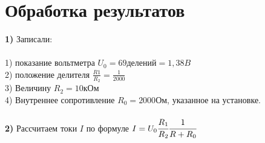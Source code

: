 \documentclass[11pt,a4paper]{article}
\begin{document}
\part*{Обработка результатов}
\textbf{1)} Записали: \\\\
1) показание вольтметра $U_0 = 69 делений = 1,38 B$ \\
2) положение делителя $\frac{R1}{R_2} = \frac{1}{2000}$ \\
3) Величину $R_2 = 10 \text{кОм}$ \\
4) Внутреннее сопротивление $R_0 = 2000 \text{Ом}$, указанное на установке. \\\\
\textbf{2)} Рассчитаем токи $I$ по формуле $I = U_{0} \cfrac{R_1}{R_2} \cfrac{1}{R+R_0}$
\\
\end{document}
